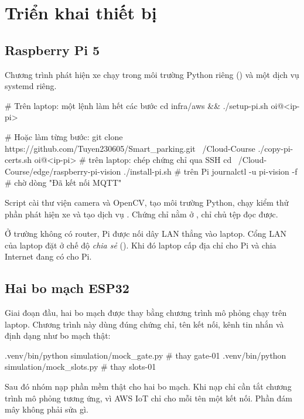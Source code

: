 \section{Triển khai thiết bị}

\subsection{Raspberry Pi 5}

Chương trình phát hiện xe chạy trong môi trường Python riêng () và một dịch vụ systemd riêng.

\begin{lenh}
# Trên laptop: một lệnh làm hết các bước
cd infra/aws && ./setup-pi.sh oi@<ip-pi>

# Hoặc làm từng bước:
git clone https://github.com/Tuyen230605/Smart_parking.git ~/Cloud-Course
./copy-pi-certs.sh oi@<ip-pi>     # trên laptop: chép chứng chỉ qua SSH
cd ~/Cloud-Course/edge/raspberry-pi-vision
./install-pi.sh                   # trên Pi
journalctl -u pi-vision -f        # chờ dòng "Đã kết nối MQTT"
\end{lenh}

Script  cài thư viện camera và OpenCV, tạo môi trường Python, chạy kiểm thử phần phát hiện xe và tạo dịch vụ . Chứng chỉ nằm ở , chỉ chủ tệp đọc được.

Ở trường không có router, Pi được nối dây LAN thẳng vào laptop. Cổng LAN của laptop đặt ở chế độ \emph{chia sẻ} (). Khi đó laptop cấp địa chỉ  cho Pi và chia Internet đang có cho Pi.

\subsection{Hai bo mạch ESP32}

Giai đoạn đầu, hai bo mạch được thay bằng chương trình mô phỏng chạy trên laptop. Chương trình này dùng đúng chứng chỉ, tên kết nối, kênh tin nhắn và định dạng như bo mạch thật:

\begin{lenh}
.venv/bin/python simulation/mock_gate.py    # thay gate-01
.venv/bin/python simulation/mock_slots.py   # thay slots-01
\end{lenh}

Sau đó nhóm nạp phần mềm thật cho hai bo mạch. Khi nạp chỉ cần tắt chương trình mô phỏng tương ứng, vì AWS IoT chỉ cho mỗi tên một kết nối. Phần đám mây không phải sửa gì.

